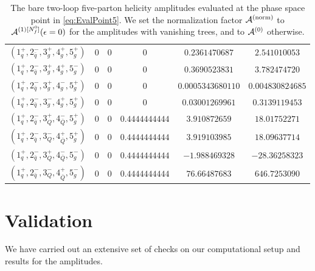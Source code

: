 \begin{table}[!htbp]
\begin{adjustbox}{width=1\textwidth}
\begin{tabular}{cccccc}
      \midrule
      $( 1_q^+, 2_{\bar q}^-, 3_g^+, 4_g^+, 5_g^+ )$ & 0 & 0 & 0 & $0.2361470687$ & $2.541010053$ \\
      $( 1_q^+, 2_{\bar q}^-, 3_g^+, 4_g^+, 5_g^- )$ & 0 & 0 & 0 & $0.3690523831$ & $3.782474720$ \\
      $( 1_q^+, 2_{\bar q}^-, 3_g^+, 4_g^-, 5_g^+ )$ & 0 & 0 & 0 & $0.0005343680110$ & $0.004830824685$ \\
      $( 1_q^+, 2_{\bar q}^-, 3_g^-, 4_g^+, 5_g^+ )$ & 0 & 0 & 0 & $0.03001269961$ & $0.3139119453$ \\
      \midrule
      $( 1_q^+, 2_{\bar q}^-, 3_Q^+, 4_{\bar Q}^-, 5_g^+ )$ & 0 & 0 & $0.4444444444$ & $3.910872659$ & $18.01752271$ \\
      $( 1_q^+, 2_{\bar q}^-, 3_Q^-, 4_{\bar Q}^+, 5_g^+ )$ & 0 & 0 & $0.4444444444$ & $3.919103985$ & $18.09637714$ \\
      $( 1_q^+, 2_{\bar q}^-, 3_Q^+, 4_{\bar Q}^-, 5_g^- )$ & 0 & 0 & $0.4444444444$ & $-1.988469328$ & $-28.36258323$ \\
      $( 1_q^+, 2_{\bar q}^-, 3_Q^-, 4_{\bar Q}^+, 5_g^- )$ & 0 & 0 & $0.4444444444$ & $76.66487683$ & $646.7253090$ \\
      \bottomrule
    \end{tabular}
  \end{adjustbox}
  \caption{The bare two-loop five-parton helicity amplitudes evaluated
    at the phase space point in \cref{eq:EvalPoint5}. We set the
    normalization factor $\mathcal{A}^\mathrm{(norm)}$ to $\mathcal{A}^{(1)[N_f^0]}(\epsilon=0)$ for the
    amplitudes with vanishing trees, and to $\mathcal{A}^{(0)}$ otherwise.} 
  \label{tab:results5parton}
\end{table}

\section{Validation}
\label{sec:Validation-5parton}

We have carried out an extensive set of checks on our computational setup and results for the amplitudes.

